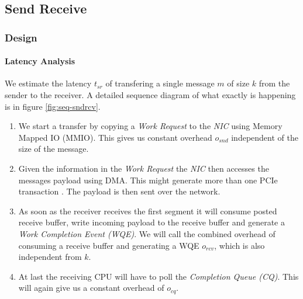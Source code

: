 \subsection{Send Receive}\label{sendrcv}
\subsubsection{Design} \label{sendrcv-design}

\newcommand{\seqnode}[3][]{ 
  \node[#1] (#2) {#3};
  \node[below of=#2, node distance=5cm] (#2_g) {};
  \draw (#2) -- (#2_g);
}
\newcommand{\hseqnode}[3][]{ 
  \node[#1] (#2) {#3};
  \node[below of=#2, node distance=5cm] (#2_g) {};
}
\newcommand{\msg}[5][above]{
  \draw[->] ($(#2)!#4!(#2_g)$) -- node[#1,scale=0.75,midway]{#5} ($(#3)!#4+0.04!(#3_g)$);
}
\newcommand{\fetch}[4]{
  \draw[-] ($(#1)!#3-0.04!(#1_g)$) -- node[above,scale=0.75,midway]{#4} ($(#2)!#3!(#2_g)$);
  \draw[->] ($(#2)!#3!(#2_g)$) -- node[above,scale=0.75,midway]{} ($(#1)!#3+0.04!(#1_g)$);
}


\paragraph{Latency Analysis}

We estimate the latency $t_{sr}$ of transfering a single message $m$ of size $k$ from the sender to the receiver. 
A detailed sequence diagram of what exactly is happening is in figure \ref{fig:seq-sndrcv}. 

\begin{enumerate}
  \item We start a transfer by copying a \emph{Work Request} to the \emph{NIC} using Memory Mapped IO (MMIO). This gives
    us constant overhead $o_{snd}$ independent of the size of the message.
  \item Given the information in the \emph{Work Request} the \emph{NIC} then accesses the messages payload using DMA. This 
    might generate more than one PCIe transaction \cite{atc16-kalia}. The payload is then sent over the network.
  \item As soon as the receiver receives the first segment it will consume posted receive buffer, write incoming payload 
    to the receive buffer and generate a \emph{Work Completion Event (WQE)}. We will call the combined overhead of consuming a receive
    buffer and generating a WQE $o_{rcv}$, which is also independent from $k$.
  \item At last the receiving CPU will have to poll the \emph{Completion Queue (CQ)}. This will again give us a constant 
    overhead of $o_{cq}$.
\end{enumerate}


